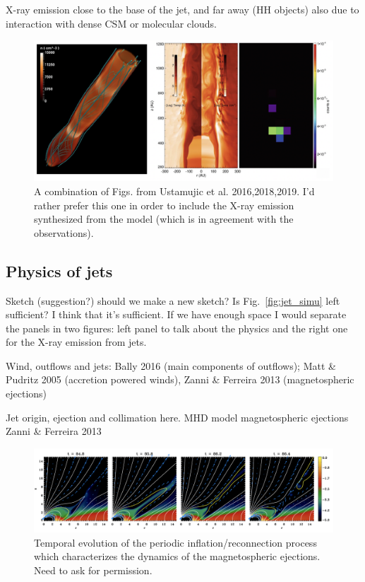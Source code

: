 X-ray emission close to the base of the jet, and far away (HH objects) also due to interaction with dense CSM or molecular clouds.
 

\begin{figure}
    \centering
    \includegraphics[width=12cm]{figs/ustamujic.png}
    \caption{A combination of Figs. from Ustamujic et al. 2016,2018,2019. I'd rather prefer this one in order to include the X-ray emission synthesized from the model (which is in agreement with the observations).}
    \label{fig:ustamujic}
\end{figure}

\subsection{Physics of jets}
Sketch (suggestion?) should we make a new sketch? Is Fig.~\ref{fig:jet_simu} left sufficient?
I think that it's sufficient. If we have enough space I would separate the panels in two figures: left panel to talk about the physics and the right one for the X-ray emission from jets.

Wind, outflows and jets: Bally 2016 (main components of outflows); Matt \& Pudritz 2005 (accretion powered winds), Zanni \& Ferreira 2013 (magnetospheric ejections)

Jet origin, ejection and collimation here.
MHD model magnetospheric ejections Zanni \& Ferreira 2013

\begin{figure}
    \centering
    \includegraphics[width=12cm]{figs/Zanni2013.png}
    \caption{Temporal evolution of the periodic inflation/reconnection process which characterizes the dynamics of the magnetospheric ejections. Need to ask for permission.}
    \label{fig:zanni2013}
\end{figure}

